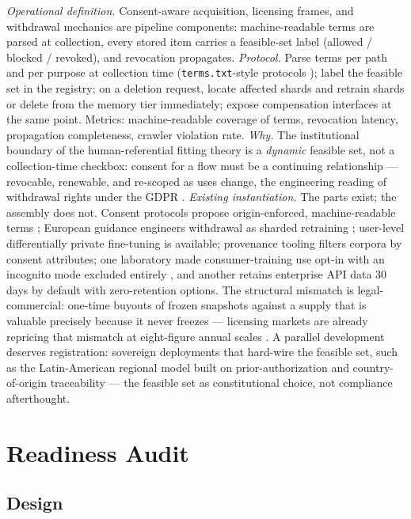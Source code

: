 \documentclass[10pt]{article}
\begin{document}
\emph{Operational definition.} Consent-aware acquisition, licensing frames, and withdrawal mechanics are pipeline components: machine-readable terms are parsed at collection, every stored item carries a feasible-set label (allowed / blocked / revoked), and revocation propagates. \emph{Protocol.} Parse terms per path and per purpose at collection time (\texttt{terms.txt}-style protocols \cite{ref59}); label the feasible set in the registry; on a deletion request, locate affected shards and retrain shards or delete from the memory tier immediately; expose compensation interfaces at the same point. Metrics: machine-readable coverage of terms, revocation latency, propagation completeness, crawler violation rate. \emph{Why.} The institutional boundary of the human-referential fitting theory is a \emph{dynamic} feasible set, not a collection-time checkbox: consent for a flow must be a continuing relationship --- revocable, renewable, and re-scoped as uses change, the engineering reading of withdrawal rights under the GDPR \cite{ref60}. \emph{Existing instantiation.} The parts exist; the assembly does not. Consent protocols propose origin-enforced, machine-readable terms \cite{ref59}; European guidance engineers withdrawal as sharded retraining \cite{ref61}; user-level differentially private fine-tuning is available; provenance tooling filters corpora by consent attributes; one laboratory made consumer-training use opt-in with an incognito mode excluded entirely \cite{ref62}, and another retains enterprise API data 30 days by default with zero-retention options. The structural mismatch is legal-commercial: one-time buyouts of frozen snapshots against a supply that is valuable precisely because it never freezes \cite{ref10} --- licensing markets are already repricing that mismatch at eight-figure annual scales \cite{ref63}. A parallel development deserves registration: sovereign deployments that hard-wire the feasible set, such as the Latin-American regional model built on prior-authorization and country-of-origin traceability \cite{ref64} --- the feasible set as constitutional choice, not compliance afterthought.

\section{Readiness Audit}

\subsection{Design}
\end{document}
